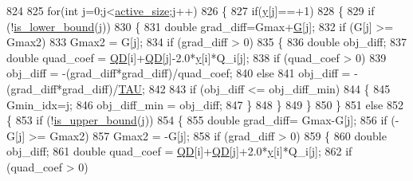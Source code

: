 \begin{DoxyCode}
824 
825     \textcolor{keywordflow}{for}(\textcolor{keywordtype}{int} j=0;j<\hyperlink{class_solver_a06ba1b87b3749cc545e573151b7beca0}{active\_size};j++)
826     \{
827         \textcolor{keywordflow}{if}(\hyperlink{class_solver_a3acc1043d06dedf87f054ff3eea5c426}{y}[j]==+1)
828         \{
829             \textcolor{keywordflow}{if} (!\hyperlink{class_solver_a5876eedb0a6de6954f6037af0992cbed}{is\_lower\_bound}(j))
830             \{
831                 \textcolor{keywordtype}{double} grad\_diff=Gmax+\hyperlink{class_solver_ad8ab27068f2e045591970aae1201afe9}{G}[j];
832                 \textcolor{keywordflow}{if} (G[j] >= Gmax2)
833                     Gmax2 = G[j];
834                 \textcolor{keywordflow}{if} (grad\_diff > 0)
835                 \{
836                     \textcolor{keywordtype}{double} obj\_diff;
837                     \textcolor{keywordtype}{double} quad\_coef = \hyperlink{class_solver_a7c7b7b1207983543855165e8eb249f2a}{QD}[i]+\hyperlink{class_solver_a7c7b7b1207983543855165e8eb249f2a}{QD}[j]-2.0*\hyperlink{class_solver_a3acc1043d06dedf87f054ff3eea5c426}{y}[i]*Q\_i[j];
838                     \textcolor{keywordflow}{if} (quad\_coef > 0)
839                         obj\_diff = -(grad\_diff*grad\_diff)/quad\_coef;
840                     \textcolor{keywordflow}{else}
841                         obj\_diff = -(grad\_diff*grad\_diff)/\hyperlink{svm_8cpp_a3d8c9c145887af5174ba4cc6789862ad}{TAU};
842 
843                     \textcolor{keywordflow}{if} (obj\_diff <= obj\_diff\_min)
844                     \{
845                         Gmin\_idx=j;
846                         obj\_diff\_min = obj\_diff;
847                     \}
848                 \}
849             \}
850         \}
851         \textcolor{keywordflow}{else}
852         \{
853             \textcolor{keywordflow}{if} (!\hyperlink{class_solver_a98d878b13d6f710fcaa0b16e657a37b6}{is\_upper\_bound}(j))
854             \{
855                 \textcolor{keywordtype}{double} grad\_diff= Gmax-G[j];
856                 \textcolor{keywordflow}{if} (-G[j] >= Gmax2)
857                     Gmax2 = -G[j];
858                 \textcolor{keywordflow}{if} (grad\_diff > 0)
859                 \{
860                     \textcolor{keywordtype}{double} obj\_diff;
861                     \textcolor{keywordtype}{double} quad\_coef = \hyperlink{class_solver_a7c7b7b1207983543855165e8eb249f2a}{QD}[i]+\hyperlink{class_solver_a7c7b7b1207983543855165e8eb249f2a}{QD}[j]+2.0*\hyperlink{class_solver_a3acc1043d06dedf87f054ff3eea5c426}{y}[i]*Q\_i[j];
862                     \textcolor{keywordflow}{if} (quad\_coef > 0)

\end{DoxyCode}
